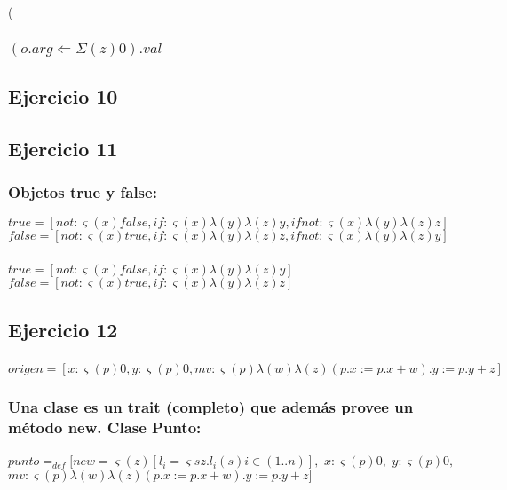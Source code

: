 \left( \documentclass[10pt,a4paper]{article}
\begin{document}
\subsubsection{$(o.arg \Leftarrow \Sigma(z)0).val$}
\subsection{Ejercicio 10}
\subsection{Ejercicio 11}
\subsubsection{Objetos true y false:}
$
true = [not: \varsigma(x)false,if: \varsigma(x)\lambda(y)\lambda(z)y,ifnot: \varsigma(x)\lambda(y)\lambda(z)z]
$ \\
$
false = [not: \varsigma(x)true,if: \varsigma(x)\lambda(y)\lambda(z)z,ifnot: \varsigma(x)\lambda(y)\lambda(z)y]
$
\subsubsection{}
$
true = [not: \varsigma(x)false,if: \varsigma(x)\lambda(y)\lambda(z)y]
$ \\
$
false = [not: \varsigma(x)true,if: \varsigma(x)\lambda(y)\lambda(z)z]
$
\subsection{Ejercicio 12}
\subsubsection{}
$
origen = [x: \varsigma(p)0, y: \varsigma(p)0,mv: \varsigma(p)\lambda(w)\lambda(z) (p.x:=p.x+w).y:=p.y+z]
$
\subsubsection{Una clase es un trait (completo) que además provee un
método new. Clase Punto:}
$
punto =_{def} [new=\varsigma(z)[ l_{i} = \varsigma{s}z.l_{i}(s) i\in(1..n)],$  $x: \varsigma(p)0,$  $y: \varsigma(p)0,$  $mv: \varsigma(p)\lambda(w)\lambda(z) (p.x:=p.x+w).y:=p.y+z]
$
\subsubsection{}
    \begin{lstlisting}
    \end{lstlisting}
\end{document}
